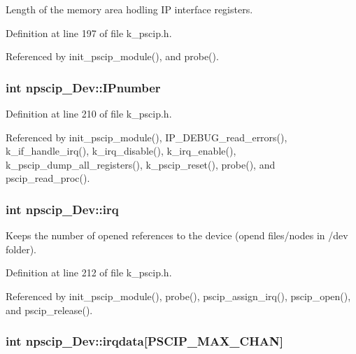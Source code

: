 Length of the memory area hodling IP interface registers. 



Definition at line 197 of file k\_\-pscip.h.

Referenced by init\_\-pscip\_\-module(), and probe().\hypertarget{structnpscip___dev_6bf8d25b955da3e4560bffb7737cd2f5}{
\subsubsection[{IPnumber}]{\setlength{\rightskip}{0pt plus 5cm}int {\bf npscip\_\-Dev::IPnumber}}}
\label{structnpscip___dev_6bf8d25b955da3e4560bffb7737cd2f5}




Definition at line 210 of file k\_\-pscip.h.

Referenced by init\_\-pscip\_\-module(), IP\_\-DEBUG\_\-read\_\-errors(), k\_\-if\_\-handle\_\-irq(), k\_\-irq\_\-disable(), k\_\-irq\_\-enable(), k\_\-pscip\_\-dump\_\-all\_\-registers(), k\_\-pscip\_\-reset(), probe(), and pscip\_\-read\_\-proc().\hypertarget{structnpscip___dev_9e516ab0b05d5588434b93ecbf9db04d}{
\subsubsection[{irq}]{\setlength{\rightskip}{0pt plus 5cm}int {\bf npscip\_\-Dev::irq}}}
\label{structnpscip___dev_9e516ab0b05d5588434b93ecbf9db04d}


Keeps the number of opened references to the device (opend files/nodes in /dev folder). 



Definition at line 212 of file k\_\-pscip.h.

Referenced by init\_\-pscip\_\-module(), probe(), pscip\_\-assign\_\-irq(), pscip\_\-open(), and pscip\_\-release().\hypertarget{structnpscip___dev_2d77c2f8b559f45698716fd09adf4786}{
\subsubsection[{irqdata}]{\setlength{\rightskip}{0pt plus 5cm}int {\bf npscip\_\-Dev::irqdata}\mbox{[}PSCIP\_\-MAX\_\-CHAN\mbox{]}}}
\label{structnpscip___dev_2d77c2f8b559f45698716fd09adf4786}



